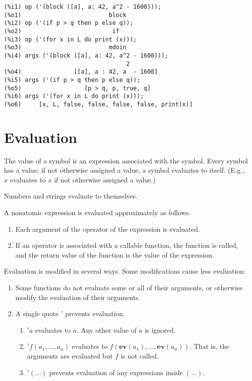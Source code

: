 \documentclass[12pt]{article}
\begin{document}
\begin{enumerate}
\begin{verbatim}
(%i1) op ('(block ([a], a: 42, a^2 - 1600)));
(%o1)                         block
(%i2) op ('(if p > q then p else q));
(%o2)                          if
(%i3) op ('(for x in L do print (x)));
(%o3)                         mdoin
(%i4) args ('(block ([a], a: 42, a^2 - 1600)));
                                   2
(%o4)               [[a], a : 42, a  - 1600]
(%i5) args ('(if p > q then p else q));
(%o5)                  [p > q, p, true, q]
(%i6) args ('(for x in L do print (x)));
(%o6)     [x, L, false, false, false, false, print(x)]
\end{verbatim}

\end{enumerate}

\section{Evaluation}

The value of a symbol is an expression associated with the symbol.
Every symbol has a value;
if not otherwise assigned a value, a symbol evaluates to itself.
(E.g., $x$ evaluates to $x$ if not otherwise assigned a value.)

Numbers and strings evaluate to themselves.

A nonatomic expression is evaluated approximately as follows.

\begin{enumerate}
\item Each argument of the operator of the expression is evaluated.
\item If an operator is associated with a callable function, the function is called,
and the return value of the function is the value of the expression.
\end{enumerate}

Evaluation is modified in several ways.
Some modifications cause less evaluation:

\begin{enumerate}
\item Some functions do not evaluate some or all of their arguments, 
    or otherwise modify the evaluation of their arguments.
\item A single quote $'$ prevents evaluation.
    \begin{enumerate}
    \item $'a$ evaluates to $a$. Any other value of $a$ is ignored.
    \item $'f(a_1, \ldots, a_n)$ evaluates to $f(\mathbf{ev}(a_1), \ldots, \mathbf{ev}(a_n))$.
        That is, the arguments are evaluated but $f$ is not called.
    \item $'(\ldots)$ prevents evaluation of any expressions inside $(...)$.
    \end{enumerate}
\end{enumerate}
\end{document}
